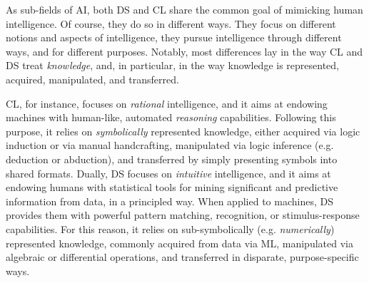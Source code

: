 \documentclass[12pt,a4paper,openright,twoside]{book}
\begin{document}
As sub-fields of AI, both DS and CL share the common goal of mimicking human intelligence.
%
Of course, they do so in different ways.
%
They focus on different notions and aspects of intelligence, they pursue intelligence through different ways, and for different purposes.
%
Notably, most differences lay in the way CL and DS treat \emph{knowledge}, and, in particular, in the way knowledge is represented, acquired, manipulated, and transferred.

CL, for instance, focuses on \emph{rational} intelligence, and it aims at endowing machines with human-like, automated \emph{reasoning} capabilities.
%
Following this purpose, it relies on \emph{symbolically} represented knowledge, either acquired via logic induction or via manual handcrafting, manipulated via logic inference (e.g. deduction or abduction), and transferred by simply presenting symbols into shared formats.
%
Dually, DS focuses on \emph{intuitive} intelligence, and it aims at endowing humans with statistical tools for mining significant and predictive information from data, in a principled way.
%
When applied to machines, DS provides them with powerful pattern matching, recognition, or stimulus-response capabilities.
%
For this reason, it relies on sub-symbolically (e.g. \emph{numerically}) represented knowledge, commonly acquired from data via ML, manipulated via algebraic or differential operations, and transferred in disparate, purpose-specific ways.
\end{document}
